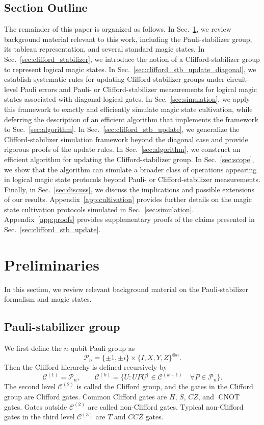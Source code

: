 \documentclass[
 reprint,
 amsmath,amssymb,
 pra,superscriptaddress, nofootinbib
]{revtex4-2}
\theoremstyle{definition}
\theoremstyle{plain}
\newcommand{\cP}{\mathcal P}
\newcommand{\cC}{\mathcal C}
\newcommand{\CNOT}{\operatorname{CNOT}}
\begin{document}
\subsection{Section Outline}
The remainder of this paper is organized as follows.
In Sec.~\ref{sec:prelims}, we review background material relevant to this work, including the Pauli-stabilizer group, its tableau representation, and several standard magic states. 
In Sec.~\ref{sec:clifford_stabilizer}, we introduce the notion of a Clifford-stabilizer group to represent logical magic states.
In Sec.~\ref{sec:clifford_stb_update_diagonal}, we establish systematic rules for updating Clifford-stabilizer groups under circuit-level Pauli errors and Pauli- or Clifford-stabilizer measurements for logical magic states associated with diagonal logical gates.
In Sec.~\ref{sec:simulation}, we apply this framework to exactly and efficiently simulate magic state cultivation, while deferring the description of an efficient algorithm that implements the framework to Sec.~\ref{sec:algorithm}.
In Sec.~\ref{sec:clifford_stb_update}, we generalize the Clifford-stabilizer simulation framework beyond the diagonal case and provide rigorous proofs of the update rules.
In Sec.~\ref{sec:algorithm}, we construct an efficient algorithm for updating the Clifford-stabilizer group.
In Sec.~\ref{sec:scope}, we show that the algorithm can simulate a broader class of operations appearing in logical magic state protocols beyond Pauli- or Clifford-stabilizer measurements.
Finally, in Sec.~\ref{sec:discuss}, we discuss the implications and possible extensions of our results.
Appendix~\ref{app:cultivation} provides further details on the magic state cultivation protocols simulated in Sec.~\ref{sec:simulation}.
Appendix~\ref{app:proofs} provides supplementary proofs of the claims presented in Sec.~\ref{sec:clifford_stb_update}.

\section{Preliminaries}\label{sec:prelims}

In this section, we review relevant background material on the Pauli-stabilizer formalism and magic states. 

\subsection{Pauli-stabilizer group}
\label{subsec:prelims_pauli}
We first define the $n$-qubit Pauli group as
\begin{equation}
\cP_n=\{\pm1, \pm i\} \times \{I,X,Y,Z\}^{\otimes n}.
\end{equation}
Then the Clifford hierarchy is defined recursively by
\begin{equation}
\cC^{(1)}=\cP_n,\qquad
\cC^{(k)}=\{U:UPU^\dagger\in \cC^{(k-1)} \quad \forall P\in\cP_n\}.
\end{equation}
The second level $\cC^{(2)}$ is called the Clifford group, and the gates in the Clifford group are Clifford gates. Common Clifford gates are $H$, $S$, $CZ$, and $\CNOT$ gates.
Gates outside $\cC^{(2)}$ are called non-Clifford gates. Typical non-Clifford gates in the third level $\cC^{(3)}$ are $T$ and $CCZ$ gates.
\end{document}
